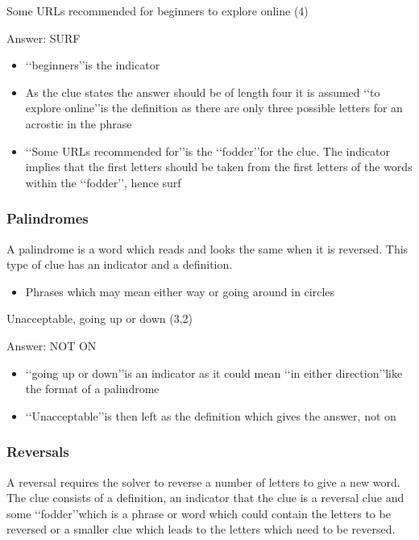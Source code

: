 Some URLs recommended for beginners to explore online (4) 

Answer: SURF 

\begin{itemize}
	\item \lq\lq beginners\rq\rq is the indicator 
	\item As the clue states the answer should be of length four it is assumed \lq\lq to explore online\rq\rq is the definition as there are only three possible letters for an acrostic in the phrase 
	\item \lq\lq Some URLs recommended for\rq\rq is the \lq\lq fodder\rq\rq for the clue. The indicator implies that the first letters should be taken from the first letters of the words within the \lq\lq fodder\rq\rq, hence surf  
\end{itemize}
 
\subsubsection{Palindromes}

A palindrome is a word which reads and looks the same when it is reversed. This type of clue has an indicator and a definition. 

\begin{itemize} 
	\item Phrases which may mean either way or going around in circles
\end{itemize}


Unacceptable, going up or down (3,2) 

Answer: NOT ON 

\begin{itemize}
	\item \lq\lq going up or down\rq\rq is an indicator as it could mean \lq\lq in either direction\rq\rq like the format of a palindrome 
	\item \lq\lq Unacceptable\rq\rq is then left as the definition which gives the answer, not on 
\end{itemize}

\subsubsection{Reversals}

A reversal requires the solver to reverse a number of letters to give a new word. The clue consists of a definition, an indicator that the clue is a reversal clue and some \lq\lq fodder\rq\rq which is a phrase or word which could contain the letters to be reversed or a smaller clue which leads to the letters which need to be reversed.  


